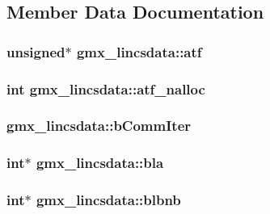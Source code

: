 \subsection{\-Member \-Data \-Documentation}
\hypertarget{structgmx__lincsdata_a03bbceb7bc9b174f8246c86dbed1046f}{
\subsubsection[{atf}]{\setlength{\rightskip}{0pt plus 5cm}unsigned$\ast$ {\bf gmx\-\_\-lincsdata\-::atf}}}\label{structgmx__lincsdata_a03bbceb7bc9b174f8246c86dbed1046f}
\hypertarget{structgmx__lincsdata_adaf7f9b267ad2e5cde915ab800eb6896}{
\subsubsection[{atf\-\_\-nalloc}]{\setlength{\rightskip}{0pt plus 5cm}int {\bf gmx\-\_\-lincsdata\-::atf\-\_\-nalloc}}}\label{structgmx__lincsdata_adaf7f9b267ad2e5cde915ab800eb6896}
\hypertarget{structgmx__lincsdata_a97e4f5c52f18b81e1ea6bc4d630072ef}{
\subsubsection[{b\-Comm\-Iter}]{ {\bf gmx\-\_\-lincsdata\-::b\-Comm\-Iter}}}\label{structgmx__lincsdata_a97e4f5c52f18b81e1ea6bc4d630072ef}
\hypertarget{structgmx__lincsdata_a6a3c465e3d8c24c5d9bd2501653001e6}{
\subsubsection[{bla}]{\setlength{\rightskip}{0pt plus 5cm}int$\ast$ {\bf gmx\-\_\-lincsdata\-::bla}}}\label{structgmx__lincsdata_a6a3c465e3d8c24c5d9bd2501653001e6}
\hypertarget{structgmx__lincsdata_a19493d57de0beeee3536487c800de9ed}{
\subsubsection[{blbnb}]{\setlength{\rightskip}{0pt plus 5cm}int$\ast$ {\bf gmx\-\_\-lincsdata\-::blbnb}}}\label{structgmx__lincsdata_a19493d57de0beeee3536487c800de9ed}

